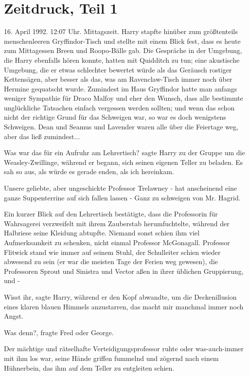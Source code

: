 \chapter{Zeitdruck, Teil 1}

16. April 1992. 12:07 Uhr. Mittagszeit. Harry stapfte hinüber zum größtenteils
menschenleeren Gryffindor-Tisch und stellte mit einem Blick fest, dass es heute
zum Mittagessen Breen und Roopo-Bälle gab. Die Gespräche in der Umgebung, die
Harry ebenfalls hören konnte, hatten mit Quidditch zu tun; eine akustische
Umgebung, die er etwas schlechter bewertet würde als das Geräusch rostiger
Kettensägen, aber besser als das, was am Ravenclaw-Tisch immer noch über Hermine
gequatscht wurde. Zumindest im Haus Gryffindor hatte man anfangs weniger
Sympathie für Draco Malfoy und eher den Wunsch, dass alle bestimmte unglückliche
Tatsachen einfach vergessen werden sollten; und wenn das schon nicht der
richtige Grund für das Schweigen war, so war es doch wenigstens Schweigen. Dean
und Seamus und Lavender waren alle über die Feiertage weg, aber das ließ
zumindest...

\glqq{}Was war das für ein Aufruhr am Lehrertisch?\grqq{} sagte Harry zu der
Gruppe um die Weasley-Zwillinge, während er begann, sich seinen eigenen Teller
zu beladen. \glqq{}Es sah so aus, als würde es gerade enden, als ich
hereinkam.\grqq{}

\glqq{}Unsere geliebte, aber ungeschickte Professor Trelawney -\grqq{} \glqq{}hat
anscheinend eine ganze Suppenterrine auf sich fallen lassen -\grqq{} \glqq{}Ganz
zu schweigen von Mr. Hagrid.\grqq{}

Ein kurzer Blick auf den Lehrertisch bestätigte, dass die Professorin für
Wahrsagerei verzweifelt mit ihrem Zauberstab herumfuchtelte, während der
Halbriese seine Kleidung abtupfte. Niemand sonst schien ihm viel Aufmerksamkeit
zu schenken, nicht einmal Professor McGonagall. Professor Flitwick stand wie
immer auf seinem Stuhl, der Schulleiter schien wieder abwesend zu sein (er war
die meisten Tage der Ferien weg gewesen), die Professoren Sprout und Sinistra
und Vector aßen in ihrer üblichen Gruppierung, und -

\glqq{}Wisst ihr\grqq{}, sagte Harry, während er den Kopf abwandte, um die
Deckenillusion eines klaren blauen Himmels anzustarren, \glqq{}das macht mir
manchmal immer noch Angst.\grqq{}

\glqq{}Was denn?\grqq{}, fragte Fred oder George.

Der mächtige und rätselhafte Verteidigungsprofessor \glqq{}ruhte\grqq{} oder
was-auch-immer mit ihm los war, seine Hände griffen fummelnd und zögernd nach
einem Hühnerbein, das ihm auf dem Teller zu entgleiten schien.

